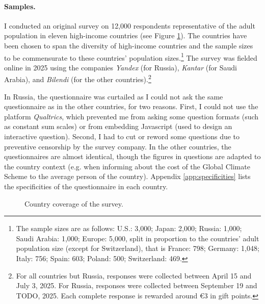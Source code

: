 \documentclass[12pt,english]{article}
\begin{document}
\begin{bibunit}
\paragraph{Samples.}
I conducted an original survey on 12,000 respondents representative of the adult population in eleven high-income countries (see Figure \ref{fig:country_coverage}). The countries have been chosen to span the diversity of high-income countries and the sample sizes to be commensurate to these countries' population sizes.\footnote{The sample sizes are as follows: U.S.: 3,000; Japan: 2,000; Russia: 1,000; Saudi Arabia: 1,000; Europe: 5,000, split in proportion to the countries' adult population size (except for Switzerland), that is France: 798; Germany: 1,048; Italy: 756; Spain: 603; Poland: 500; Switzerland: 469.} %
The survey was fielded online in 2025 using the companies \textit{Yandex} (for Russia), \textit{Kantar} (for Saudi Arabia), and \textit{Bilendi} (for the other countries).\footnote{For all countries but Russia, responses were collected between April 15 and July 3, 2025. For Russia, responses were collected between September 19 and TODO, 2025. Each complete response is rewarded around \euro{}3 in gift points.} 

In Russia, the questionnaire was curtailed as I could not ask the same questionnaire as in the other countries, for two reasons. First, I could not use the platform \textit{Qualtrics}, which prevented me from asking some question formats (such as constant sum scales) or from embedding Javascript (used to design an interactive question). Second, I had to cut or reword some questions due to preventive censorship by the survey company. In the other countries, the questionnaires are almost identical, though the figures in questions are adapted to the country context (e.g. when informing about the cost of the Global Climate Scheme to the average person of the country). Appendix \ref{app:specificities} lists the specificities of the questionnaire in each country.

\begin{figure}[h!]
    \caption[Country coverage]{Country coverage of the survey.
    }\label{fig:country_coverage}
\end{figure}


\end{bibunit}
\end{document}
